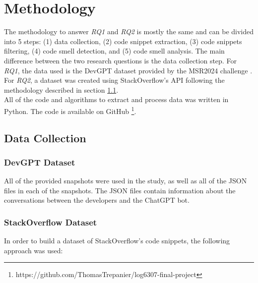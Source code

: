 
\section{Methodology}
\label{sec:methodology}
The methodology to answer \textit{RQ1} and \textit{RQ2} is mostly the same and can be divided into 5 steps: (1) data collection, (2) code snippet extraction, (3) code snippets filtering, (4) code smell detection, and (5) code smell analysis. The main difference between the two research questions is the data collection step. For \textit{RQ1}, the data used is the DevGPT dataset provided by the MSR2024 challenge \cite{devgpt}. For \textit{RQ2}, a dataset was created using StackOverflow's API following the methodology described in section \ref{sec:data-collection}. \\

All of the code and algorithms to extract and process data was written in Python. The code is available on GitHub \footnote{https://github.com/ThomasTrepanier/log6307-final-project}.

\subsection{Data Collection}
\label{sec:data-collection}
\subsubsection{DevGPT Dataset}
All of the provided snapshots were used in the study, as well as all of the JSON files in each of the snapshots. The JSON files contain information about the conversations between the developers and the ChatGPT bot. \\

\subsubsection{StackOverflow Dataset}
In order to build a dataset of StackOverflow's code snippets, the following approach was used: \\

